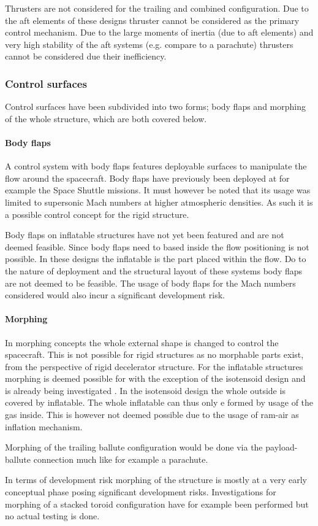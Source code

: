 Thrusters are not considered for the trailing and combined configuration. Due to the aft elements of these designs thruster cannot be considered as the primary control mechanism. Due to the large moments of inertia (due to aft elements) and very high stability of the aft systems (e.g. compare to a parachute) thrusters cannot be considered due their inefficiency. 

\subsubsection{Control surfaces}
Control surfaces have been subdivided into two forms; body flaps and morphing of the whole structure, which are both covered below.

\paragraph{Body flaps}
A control system with body flaps features deployable surfaces to manipulate the flow around the spacecraft. Body flaps have previously been deployed at for example the Space Shuttle missions. It must however be noted that its usage was limited to supersonic Mach numbers at higher atmospheric densities. As such it is a possible control concept for the rigid structure.

Body flaps on inflatable structures have not yet been featured and are not deemed feasible. Since body flaps need to based inside the flow positioning is not possible. In these designs the inflatable is the part placed within the flow. Do to the nature of deployment and the structural layout of these systems body flaps are not deemed to be feasible. The usage of body flaps for the Mach numbers considered would also incur a significant development risk.

\paragraph{Morphing}
In morphing concepts the whole external shape is changed to control the spacecraft. This is not possible for rigid structures as no morphable parts exist, from the perspective of rigid decelerator structure. 
 For the inflatable structures morphing is deemed possible for with the exception of the isotensoid design and is already being investigated \cite{Hughes2011}. In the isotensoid design the whole outside is covered by inflatable. The whole inflatable can thus only e formed by usage of the gas inside. This is however not deemed possible due to the usage of ram-air as inflation mechanism.

Morphing of the trailing ballute configuration would be done via the payload-ballute connection much like for example a parachute.

In terms of development risk morphing of the structure is mostly at a very early conceptual phase posing significant development risks. Investigations for morphing of a stacked toroid configuration have for example been performed \cite{Green2013} but no actual testing  is done.
